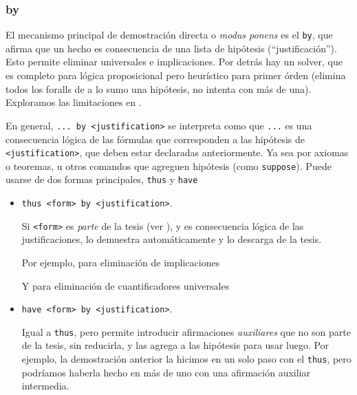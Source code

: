\subsubsection{by}

El mecanismo principal de demostración directa o \textit{modus ponens} es el
\lstinline{by}, que afirma que un hecho es consecuencia de una lista de
hipótesis (``justificación''). Esto permite eliminar universales e implicaciones. Por detrás hay un
solver, que es completo para lógica proposicional pero heurístico para primer
órden (elimina todos los foralls de a lo sumo una hipótesis, no intenta con más
de una). Exploramos las limitaciones en .

En general, \texttt{... by <justification>} se interpreta como que \texttt{...}
es una consecuencia lógica de las fórmulas que corresponden a las hipótesis de
\texttt{<justification>}, que deben estar declaradas anteriormente. Ya sea por
axiomas o teoremas, u otros comandos que agreguen hipótesis (como
\lstinline{suppose}). Puede usarse de dos formas
principales, \lstinline{thus} y \lstinline{have}

\begin{itemize}
    \item \texttt{thus <form>\ by <justification>}.
    
    Si \texttt{<form>} es \textit{parte} de la tesis (ver
    ), y es consecuencia lógica de las
    justificaciones, lo demuestra automáticamente y lo descarga de la tesis.

    Por ejemplo, para eliminación de implicaciones

    

    Y para eliminación de cuantificadores universales

    

    \item \texttt{have <form>\ by <justification>}.
    
    Igual a \lstinline{thus}, pero permite introducir afirmaciones
    \textit{auxiliares} que no son parte de la tesis, sin reducirla, y las
    agrega a las hipótesis para usar luego. Por ejemplo, la demostración
    anterior la hicimos en un solo paso con el \lstinline{thus}, pero podríamos
    haberla hecho en más de uno con una afirmación auxiliar intermedia.

    
\end{itemize}

